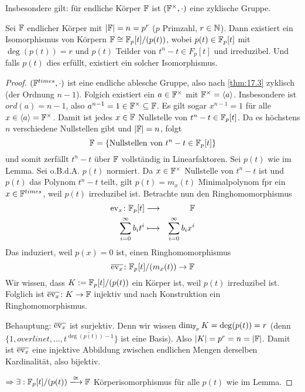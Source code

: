 \documentclass[12pt,a4paper]{scrartcl}
\begin{document}
\begin{bem} Insbesondere gilt: für endliche Körper $\mathbb F$ ist $(\mathbb F^{\times}, \cdot)$ eine zyklische Gruppe.
\end{bem}
\begin{lem}\label{lem:17.4}
	Sei $\mathbb F$ endlicher Körper mit $|\mathbb F| = n = p^r$ ($p$ Primzahl, $r\in\mathbb N$). Dann existiert ein Isomorphismus von Körpern $\mathbb F\cong \mathbb F_p[t]/(p(t))$, wobei $p(t)\in \mathbb F_p[t]$ mit $\deg(p(t)) = r$ und $p(t)$ Teilder von $t^n-t\in F_p[t]$ und irreduzibel. Und falls $p(t)$ dies erfüllt, existiert ein solcher Isomorphismus.
\end{lem}
\begin{proof}
	$(\mathbb F^{times}, \cdot)$ ist eine endliche ablesche Gruppe, also nach \ref{thm:17.3} zyklisch (der Ordnung $n-1$). Folgich existiert ein $a\in\mathbb F^{\times}$ mit $\mathbb F^{\times} = \langle a\rangle$. Insbesondere ist $ord(a) = n-1$, also $a^{n-1} = 1\in\mathbb F^{\times}\subseteq \mathbb F$. Es gilt sogar $x^{n-1} = 1$ für alle $x\in\langle a\rangle = \mathbb F^{\times}$. Damit ist jedes $x\in \mathbb F$ Nullstelle von $t^n-t\in\mathbb F_p[t]$. Da es höchstens $n$ verschiedene Nullstellen gibt und $|\mathbb F| = n $, folgt 
	$$\mathbb F= \{\text{Nullstellen von } t^n-t\in\mathbb F_p[t]\}$$
	und somit zerfällt $t^n-t$ über $\mathbb F$ vollständig in Linearfaktoren. Sei $p(t)$ wie im Lemma. Sei o.B.d.A. $p(t)$ normiert. Da $x\in\mathbb F^{\times}$ Nullstelle von $t^{n}-t$ ist und $p(t)$ das Polynom $t^{n}-t$ teilt, gilt $p(t) = m_x(t)$ Minimalpolynom fpr ein $x\in\mathbb F^{times}$, weil $p(t)$ irreduzibel ist. Betrachte nun den Ringhomomorphismus
	\begin{eqnarray*}
		\operatorname{ev}_x\colon \mathbb F_p[t] &\longrightarrow & \mathbb F\\
		\sum_{i = 0}^{\infty}b_it^i & \longmapsto & \sum_{i = 0}^{\infty}b_ix^i
	\end{eqnarray*}
	Das induziert, weil $p(x) = 0$ ist, einen Ringhomomorphismus
	$$\overline{\operatorname{ev}_x}\colon \mathbb F_p[t]/(m_x(t)) \to \mathbb F$$
	Wir wissen, dass $K :=\mathbb F_p[t]/(p(t))$ ein Körper ist, weil $p(t)$ irreduzibel ist. Folglich ist $\overline{\operatorname{ev}_x}\colon K\to \mathbb F$ injektiv und nach Konstruktion ein Ringhomomorphismus.
	
	Behauptung: $\overline{\operatorname{ev}_x}$ ist surjektiv. Denn wir wissen $\dim_{\mathbb F_p}K = \deg(p(t)) = r$ (denn $\{1,overline{t},\dots, \overline{t^{\deg(p(t))-1}}\}$ ist eine Basis). Also $|K| = p^r = n = |\mathbb F|$.  Damit ist $\overline{\operatorname{ev}_x}$ eine injektive Abbildung zwischen endlichen Mengen derselben Kardinalität, also bijektiv.
	
	$\Rightarrow \exists: \IF_p[t]/(p(t))\xlongrightarrow{\cong}\IF$ Körperisomorphismus für alle $p(t)$ wie im Lemma.
\end{proof}
\end{document}
